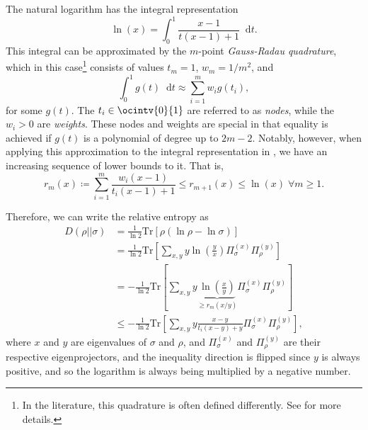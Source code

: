 \documentclass[10pt, a4paper]{article}
\numberwithin{equation}{section} %
\theoremstyle{definition}
\theoremstyle{plain}
\newcommand{\dif}{\mathop{}\!\mathrm{d}} %
\newcommand{\?}{\mathrel{?}} %
\newcommand{\Tr}{\mathrm{Tr}} %
\begin{document}
      The natural logarithm has the integral representation
      \begin{equation}
        \ln\left(x\right) = \int_{0}^{1} \frac{x-1}{t(x-1) + 1} \dif{t}.\label{eqn:integral_log}
      \end{equation}
      This integral can be approximated by the \(m\)-point \emph{Gauss-Radau quadrature}, which in this case\footnote{In the literature, this quadrature is often defined differently. See  for more details.} consists of values \(t_m = 1\), \(w_m = 1/m^2\), and
      \begin{equation}
        \int_{0}^{1} g(t) \dif{t} \approx \sum_{i=1}^m w_i g(t_i),
      \end{equation}
      for some \(g(t)\). The \(t_i \in \ocintv{0}{1}\) are referred to as \emph{nodes}, while the \(w_i > 0\) are \emph{weights}. These nodes and weights are special in that equality is achieved if \(g(t)\) is a polynomial of degree up to \(2m-2\). Notably, however, when applying this approximation to the integral representation in , we have an increasing sequence of lower bounds to it. That is,
      \begin{equation}
        r_m(x) \coloneqq \sum_{i=1}^m \frac{w_i(x-1)}{t_i(x-1) + 1} \leq r_{m+1}(x) \leq \ln\left(x\right) \;\forall m \geq 1.
      \end{equation}

      Therefore, we can write the relative entropy as
      \begin{align}
        D(\rho||\sigma) &= \frac{1}{\ln 2} \Tr\left[\rho \left(\ln\rho - \ln\sigma\right) \right] \\
                        &= \frac{1}{\ln 2} \Tr\left[ \sum_{x,y} y \ln\left(\frac{y}{x}\right) \Pi^{(x)}_{\sigma} \Pi^{(y)}_{\rho}  \right] \label{eqn:finitedim_relent} \\ 
                        &= -\frac{1}{\ln 2} \Tr\left[ \sum_{x,y} y \underbrace{\ln\left(\frac{x}{y}\right)}_{\geq r_m(x/y)} \Pi^{(x)}_{\sigma} \Pi^{(y)}_{\rho} \right] \\
                        &\leq -\frac{1}{\ln 2} \Tr\left[ \sum_{x,y} y \frac{x-y}{t_i(x-y)+y} \Pi^{(x)}_{\sigma} \Pi^{(y)}_{\rho} \right],
      \end{align}
      where \(x\) and \(y\) are eigenvalues of \(\sigma\) and \(\rho\), and \(\Pi^{(x)}_{\sigma}\) and \(\Pi^{(y)}_{\rho}\) are their respective eigenprojectors, and the inequality direction is flipped since \(y\) is always positive, and so the logarithm is always being multiplied by a negative number.
\end{document}
